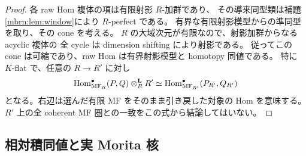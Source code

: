 \begin{proof}
各 raw Hom 複体の項は有限射影 $R$-加群であり、
その導来同型類は補題\ref{mbrn:lem:window}により $R$-perfect である。
有界な有限射影模型からの準同型を取り、その cone を考える。
$R$ の大域次元が有限なので、射影加群からなる acyclic 複体の
全 cycle は dimension shifting により射影である。
従ってこの cone は可縮であり、raw Hom は有界射影模型と homotopy 同値である。
特に $K$-flat で、任意の $R\to R'$ に対し
\begin{equation}\label{mbrn:eq:hom-basechange}
 \operatorname{Hom}_{\operatorname{MF}_R}^\bullet(P,Q)\otimes_R^{\mathbf L}R'
  \simeq
 \operatorname{Hom}_{\operatorname{MF}_{R'}}^\bullet(P_{R'},Q_{R'})
\end{equation}
となる。右辺は選んだ有限 MF をそのまま引き戻した対象の Hom を意味する。
$R'$ 上の全 coherent MF 圏との一致をこの式から結論してはいない。
\end{proof}

\subsection{相対積同値と実 Morita 核}

